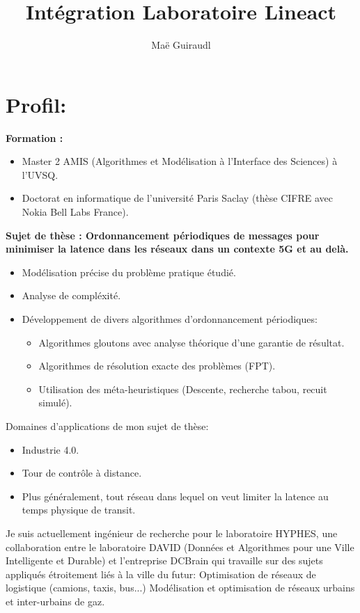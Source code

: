 \documentclass[a4paper,10pt]{article}
\title{Intégration Laboratoire Lineact}
\author{Maë Guiraudl}
\begin{document}
 
\maketitle

\section{Profil:}

\textbf{Formation :}
\begin{itemize}
\item Master 2 AMIS (Algorithmes et Modélisation à l’Interface des Sciences) à l’UVSQ. 
\item Doctorat en informatique de l’université Paris Saclay (thèse CIFRE avec Nokia Bell Labs France).
\end{itemize}

\textbf{Sujet de thèse : Ordonnancement périodiques de messages pour minimiser la latence dans les réseaux dans un contexte 5G et au delà.}
\begin{itemize}
\item Modélisation précise du problème pratique étudié.
\item Analyse de compléxité.
\item Développement de divers algorithmes d’ordonnancement périodiques:
\begin{itemize}
\item Algorithmes gloutons avec analyse théorique d’une garantie de résultat.
\item Algorithmes de résolution exacte des problèmes (FPT).
\item Utilisation des méta-heuristiques (Descente, recherche tabou, recuit simulé).
\end{itemize}
\end{itemize}


 
Domaines d’applications de mon sujet de thèse:
 \begin{itemize}
\item Industrie 4.0.
\item Tour de contrôle à distance.
\item Plus généralement, tout réseau dans lequel on veut limiter la latence au temps physique de transit.
 
\end{itemize}

        Je suis actuellement ingénieur de recherche pour le laboratoire HYPHES, une collaboration entre le laboratoire DAVID (Données et Algorithmes pour une Ville Intelligente et Durable) et l’entreprise DCBrain qui travaille sur des sujets appliqués étroitement liés à la ville du futur:
Optimisation de réseaux de logistique (camions, taxis, bus...) Modélisation et optimisation de réseaux urbains et inter-urbains de gaz.
\end{document}
